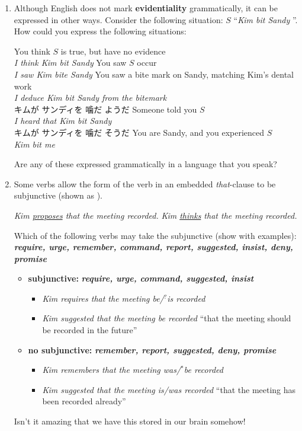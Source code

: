 \documentclass[a4paper]{article}
\newcommand{\lex}[1]{\textbf{\textit{#1}}}
\newcommand{\eng}[1]{\textit{#1}}
\newcommand{\ix}{\ex\it}
\newcommand{\ul}[1]{\uline{#1}}
\newcommand{\ull}{\uuline}
\begin{document}
\begin{enumerate}
\item Although English does not mark \textbf{evidentiality} grammatically, it
  can be expressed in other ways.  Consider the following situation:
$S$ ``\eng{Kim bit Sandy} ''.  How could you express the following situations:
  \begin{exe}
    \ex You think $S$ is true, but have no evidence
    \\ \eng{I think Kim bit Sandy}
    \ex You saw $S$ occur
    \\ \eng{I saw Kim bite Sandy}
    \ex You saw a bite mark on Sandy, matching Kim's dental work
    \\ \eng{I deduce Kim bit Sandy from the bitemark}
    \\ キムが サンディを 噛だ ようだ 
    \ex Someone told you $S$
    \\ \eng{I heard that Kim bit Sandy}
    \\ キムが サンディを 噛だ そうだ 
    \ex You are Sandy, and you experienced $S$ 
    \\ \eng{Kim bit me}
  \end{exe}
  Are any of these expressed grammatically in a language that you
  speak? 

  \newpage
\item Some verbs allow the form of the verb in an embedded
  \textit{that}-clause to be subjunctive (shown as \ull{subjunctive form}).
  \begin{exe}
  \ex \textit{Kim \ul{proposes} that the meeting \ull{be} recorded.}
  \ex *\textit{Kim \ul{thinks} that the meeting \ull{be} recorded.}
  \end{exe}
  Which of the following verbs may take the subjunctive (show with
  examples): \\ \lex{require, urge, remember, command, report,
    suggested, insist, deny, promise}
  \begin{itemize}
  \item \textbf{subjunctive:} \lex{require, urge, command, 
      suggested, insist}
     \begin{itemize}
     \item \eng{Kim requires that the meeting be/$^?$is recorded}
        \item \eng{Kim suggested that the meeting be recorded}
      ``that the meeting should be recorded in the future''
    \end{itemize}
  \item \textbf{no subjunctive:} \lex{remember, report,
    suggested,   deny, promise}
    \begin{itemize}
    \item \eng{Kim remembers that the meeting was/$^*$be recorded}
    \item \eng{Kim suggested that the meeting is/was recorded}
      ``that the meeting has been recorded already''
    \end{itemize}
  \end{itemize}
  Isn't it amazing that we have this stored in our brain somehow!



\end{enumerate}
\end{document}
